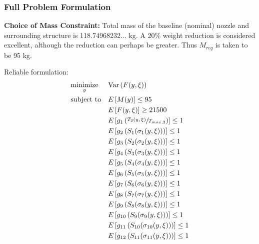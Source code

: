 \documentclass{article}
\begin{document}
\break

\subsubsection{Full Problem Formulation}

\begin{mdframed}
\textbf{Choice of Mass Constraint:}  
Total mass of the baseline (nominal) nozzle and surrounding structure is 118.74968232... kg. A 20\% weight reduction is considered excellent, although the reduction can perhaps be greater. Thus $M_{req}$ is taken to be 95 kg.
\end{mdframed}

\begin{multicols}{2}
\centering
Reliable formulation:
\begin{equation}
\label{eq:specific_robust_optim}
\begin{aligned}
& \underset{y}{\text{minimize}}
& & \textrm{Var} \left( F(y,\xi) \right) \\
& \text{subject to}
& & E \left[ M(y) \right] \leq 95 \\
& & & E \left[ F(y,\xi) \right] \geq 21500 \\
& & & E \left[ g_1 \left( \sfrac{T_2(y,\xi)}{T_{max,2}} \right) \right] \leq 1 \\
& & & E \left[ g_2 \left( S_1 ( \sigma_1(y,\xi) ) \right) \right] \leq 1 \\
& & & E \left[ g_3 \left( S_2 ( \sigma_2(y,\xi) ) \right) \right] \leq 1 \\
& & & E \left[ g_4 \left( S_3 ( \sigma_3(y,\xi) ) \right) \right] \leq 1 \\
& & & E \left[ g_5 \left( S_4 ( \sigma_4(y,\xi) ) \right) \right] \leq 1 \\
& & & E \left[ g_6 \left( S_5 ( \sigma_5(y,\xi) ) \right) \right] \leq 1 \\
& & & E \left[ g_7 \left( S_6 ( \sigma_6(y,\xi) ) \right) \right] \leq 1 \\
& & & E \left[ g_8 \left( S_7 ( \sigma_7(y,\xi) ) \right) \right] \leq 1 \\
& & & E \left[ g_9 \left( S_8 ( \sigma_8(y,\xi) ) \right) \right] \leq 1 \\
& & & E \left[ g_{10} \left( S_9 ( \sigma_9(y,\xi) ) \right) \right] \leq 1 \\
& & & E \left[ g_{11} \left( S_{10} ( \sigma_{10}(y,\xi) ) \right) \right] \leq 1 \\
& & & E \left[ g_{12} \left( S_{11} ( \sigma_{11}(y,\xi)  ) \right) \right] \leq 1 \\

\end{aligned}
\end{equation}
\end{multicols}
\end{document}
